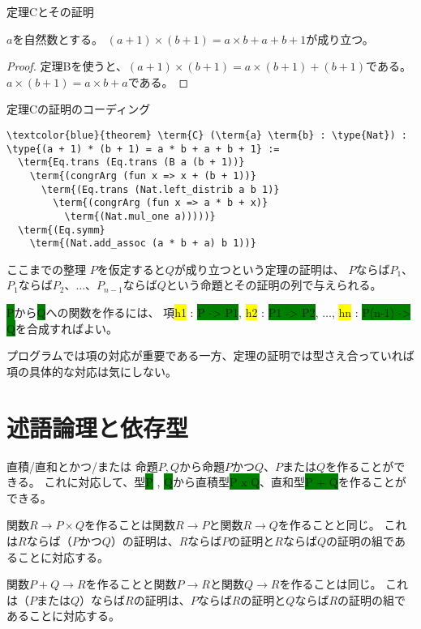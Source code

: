 \documentclass[unicode,12pt]{beamer}%
\newcommand{\type}[1]{\colorbox{green}{#1}}
\newcommand{\term}[1]{\colorbox{yellow}{#1}}
\begin{document}
\begin{frame}{定理Cとその証明}
  \begin{theorem}
    $a$を自然数とする。
    $(a+1)\times(b+1)=a\times b+a+b+1$が成り立つ。      
  \end{theorem}

  \begin{proof}
    定理Bを使うと、$(a+1)\times(b+1)=a\times(b+1)+(b+1)$である。
    $a\times(b+1)=a\times b+a$である。      
  \end{proof}
\end{frame}

\begin{frame}[fragile]{定理Cの証明のコーディング}
  \begin{tcolorbox}[title=SecondTheorems.lean]
  \setlength{\baselineskip}{12pt}
  \begin{Verbatim}[commandchars=\\\{\}, baselinestretch=1.5]
\textcolor{blue}{theorem} \term{C} (\term{a} \term{b} : \type{Nat}) :
\type{(a + 1) * (b + 1) = a * b + a + b + 1} :=
  \term{Eq.trans (Eq.trans (B a (b + 1))}
    \term{(congrArg (fun x => x + (b + 1))}
      \term{(Eq.trans (Nat.left_distrib a b 1)}
        \term{(congrArg (fun x => a * b + x)}
          \term{(Nat.mul_one a)))))}
  \term{(Eq.symm}
    \term{(Nat.add_assoc (a * b + a) b 1))}
  \end{Verbatim}
  \end{tcolorbox}  
\end{frame}

\begin{frame}{ここまでの整理}
  $P$を仮定すると$Q$が成り立つという定理の証明は、
  $P$ならば$P_1$、$P_1$ならば$P_2$、$\ldots$、$P_{n-1}$ならば$Q$という命題とその証明の列で与えられる。

  \type{P}から\type{Q}への関数を作るには、
  項\term{h1} : \type{P -> P1}, \term{h2} : \type{P1 -> P2}, $\ldots$, \term{hn} : \type{P(n-1) -> Q}を合成すればよい。

  プログラムでは項の対応が重要である一方、定理の証明では型さえ合っていれば項の具体的な対応は気にしない。
\end{frame}

\section{述語論理と依存型}

\begin{frame}{直積/直和とかつ/または}
  命題$P, Q$から命題$P$かつ$Q$、$P$または$Q$を作ることができる。
  これに対応して、型\type{P} , \type{Q}から直積型\type{P x Q}、直和型\type{P + Q}を作ることができる。

  \pause

  関数$R\to P\times Q$を作ることは関数$R\to P$と関数$R\to Q$を作ることと同じ。
  これは$R$ならば（$P$かつ$Q$）の証明は、$R$ならば$P$の証明と$R$ならば$Q$の証明の組であることに対応する。

  \pause

  関数$P+Q\to R$を作ることと関数$P\to R$と関数$Q\to R$を作ることは同じ。
  これは（$P$または$Q$）ならば$R$の証明は、$P$ならば$R$の証明と$Q$ならば$R$の証明の組であることに対応する。
\end{frame}
\end{document}
